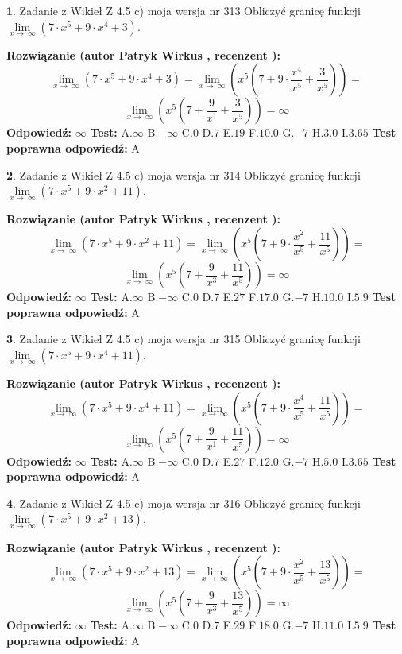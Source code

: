 \documentclass[12pt, a4paper]{article}
\theoremstyle{definition} %
\newtheorem{zad}{}
\newcommand{\zadStart}[1]{\begin{zad}#1\newline}
\newcommand{\zadStop}{\end{zad}}
\newcommand{\rozwStart}[2]{\noindent \textbf{Rozwiązanie (autor #1 , recenzent #2): }\newline}
\newcommand{\rozwStop}{\newline}
\newcommand{\odpStart}{\noindent \textbf{Odpowiedź:}\newline}
\newcommand{\odpStop}{\newline}
\newcommand{\testStart}{\noindent \textbf{Test:}\newline}
\newcommand{\testStop}{\newline}
\newcommand{\kluczStart}{\noindent \textbf{Test poprawna odpowiedź:}\newline}
\newcommand{\kluczStop}{\newline}
\begin{document}
\zadStart{Zadanie z Wikieł Z 4.5 c) moja wersja nr 313}
Obliczyć granicę funkcji  $\lim\limits_{x\to\ \infty}(7 \cdot x^{5}+9 \cdot x^{4}+3)$.
\zadStop
\rozwStart{Patryk Wirkus}{}
$$\lim\limits_{x\to\ \infty}(7 \cdot x^{5}+9 \cdot x^{4}+3) = \lim\limits_{x\to\ \infty}(x^{5}(7 +9 \cdot \frac{x^{4}}{x^{5}}+\frac{3}{x^{5}})) =$$ $$\lim\limits_{x\to\ \infty}(x^{5}(7 +\frac{9}{x^{1}}+\frac{3}{x^{5}})) =\infty$$
\rozwStop
\odpStart
$\infty$
\odpStop
\testStart
A.$\infty$ B.$-\infty$ C.$0$ D.$7$ E.$19$
F.$10.0$ G.$-7$
H.$3.0$
I.$3.65$
\testStop
\kluczStart
A
\kluczStop



\zadStart{Zadanie z Wikieł Z 4.5 c) moja wersja nr 314}
Obliczyć granicę funkcji  $\lim\limits_{x\to\ \infty}(7 \cdot x^{5}+9 \cdot x^{2}+11)$.
\zadStop
\rozwStart{Patryk Wirkus}{}
$$\lim\limits_{x\to\ \infty}(7 \cdot x^{5}+9 \cdot x^{2}+11) = \lim\limits_{x\to\ \infty}(x^{5}(7 +9 \cdot \frac{x^{2}}{x^{5}}+\frac{11}{x^{5}})) =$$ $$\lim\limits_{x\to\ \infty}(x^{5}(7 +\frac{9}{x^{3}}+\frac{11}{x^{5}})) =\infty$$
\rozwStop
\odpStart
$\infty$
\odpStop
\testStart
A.$\infty$ B.$-\infty$ C.$0$ D.$7$ E.$27$
F.$17.0$ G.$-7$
H.$10.0$
I.$5.9$
\testStop
\kluczStart
A
\kluczStop



\zadStart{Zadanie z Wikieł Z 4.5 c) moja wersja nr 315}
Obliczyć granicę funkcji  $\lim\limits_{x\to\ \infty}(7 \cdot x^{5}+9 \cdot x^{4}+11)$.
\zadStop
\rozwStart{Patryk Wirkus}{}
$$\lim\limits_{x\to\ \infty}(7 \cdot x^{5}+9 \cdot x^{4}+11) = \lim\limits_{x\to\ \infty}(x^{5}(7 +9 \cdot \frac{x^{4}}{x^{5}}+\frac{11}{x^{5}})) =$$ $$\lim\limits_{x\to\ \infty}(x^{5}(7 +\frac{9}{x^{1}}+\frac{11}{x^{5}})) =\infty$$
\rozwStop
\odpStart
$\infty$
\odpStop
\testStart
A.$\infty$ B.$-\infty$ C.$0$ D.$7$ E.$27$
F.$12.0$ G.$-7$
H.$5.0$
I.$3.65$
\testStop
\kluczStart
A
\kluczStop



\zadStart{Zadanie z Wikieł Z 4.5 c) moja wersja nr 316}
Obliczyć granicę funkcji  $\lim\limits_{x\to\ \infty}(7 \cdot x^{5}+9 \cdot x^{2}+13)$.
\zadStop
\rozwStart{Patryk Wirkus}{}
$$\lim\limits_{x\to\ \infty}(7 \cdot x^{5}+9 \cdot x^{2}+13) = \lim\limits_{x\to\ \infty}(x^{5}(7 +9 \cdot \frac{x^{2}}{x^{5}}+\frac{13}{x^{5}})) =$$ $$\lim\limits_{x\to\ \infty}(x^{5}(7 +\frac{9}{x^{3}}+\frac{13}{x^{5}})) =\infty$$
\rozwStop
\odpStart
$\infty$
\odpStop
\testStart
A.$\infty$ B.$-\infty$ C.$0$ D.$7$ E.$29$
F.$18.0$ G.$-7$
H.$11.0$
I.$5.9$
\testStop
\kluczStart
A
\kluczStop
\end{document}
